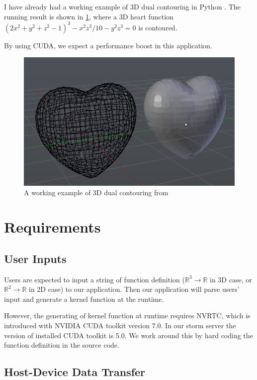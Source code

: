 \documentclass[a4paper,12pt]{article}
\begin{document}
I have already had a working example of 3D dual contouring in Python
\cite{learnblenderdev-3d-dc}.
The running result is shown in \ref{fig:3d-dc-python}, where a 3D heart function
$(2 x^2 + y^2 + z^2 - 1)^3 - x^2 z^3 / 10 - y^2 z^3 = 0$
is contoured.

By using CUDA, we expect a performance boost in this application.

\begin{figure}[h]
\centering
\includegraphics{heart-function-3d-dc.png}
\caption{A working example of 3D dual contouring from \cite{learnblenderdev-3d-dc}}
\label{fig:3d-dc-python}
\end{figure}

\section{Requirements}

\subsection{User Inputs}

Users are expected to input a string of function definition
($\mathds{R}^3 \rightarrow \mathds{R}$ in 3D case,
or $\mathds{R}^2 \rightarrow \mathds{R}$ in 2D case) to our application.
Then our application will parse users' input and generate a kernel function
at the runtime.

However, the generating of kernel function at runtime
requires NVRTC, which is introduced with NVIDIA CUDA toolkit version 7.0.
In our storm server the version of installed CUDA toolkit is 5.0.
We work around this by hard coding the function definition
in the source code.

\subsection{Host-Device Data Transfer}
\end{document}
